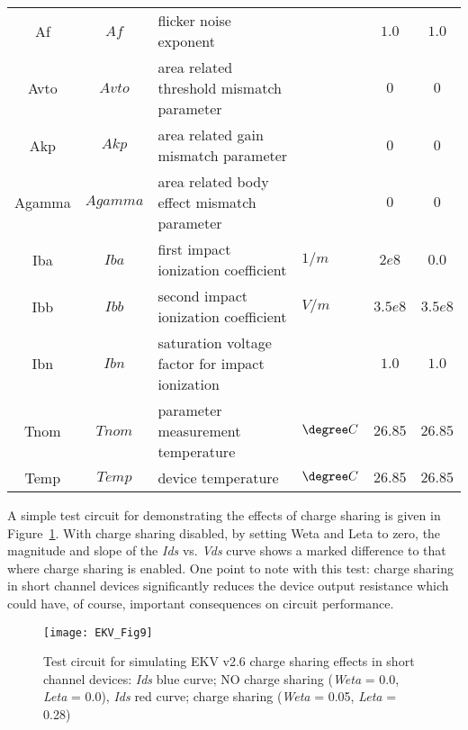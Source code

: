 \begin{scriptsize}
\begin{longtable}{ccllcc}
Af   & $Af$  & flicker noise exponent                   &    & $1.0$ & $1.0$ \\
Avto  & $Avto$ & area related threshold mismatch parameter  &    & $0$ & $0$ \\
Akp   & $Akp$  & area related gain mismatch parameter       &    & $0$ & $0$ \\
Agamma   & $Agamma$  & area related body effect mismatch parameter &    & $0$ & $0$ \\
Iba  & $Iba$ & first impact ionization coefficient  & $1/m$   & $2e8$ & $0.0$ \\
Ibb   & $Ibb$  & second impact ionization coefficient & $V/m$    & $3.5e8$ & $3.5e8$ \\
Ibn   & $Ibn$  & saturation voltage factor for impact ionization  &    & $1.0$ & $1.0$ \\
Tnom & $Tnom$ & parameter measurement temperature  & $\degree C$    & $26.85$ & $26.85$ \\
Temp & $Temp$ & device temperature  & $\degree C$   & $26.85$ & $26.85$ \\

\end{longtable}
\end{scriptsize}


A simple test circuit for demonstrating the effects of charge sharing
is given in Figure~\ref{fig:EKV9}. With charge sharing disabled, by
setting Weta and Leta to zero, the magnitude and slope of the
\textit{Ids} vs. \textit{Vds} curve shows a marked difference to that
where charge sharing is enabled.  One point to note with this test:
charge sharing in short channel devices significantly reduces the
device output resistance which could have, of course, important
consequences on circuit performance.

\begin{figure}
  \centering
  \texttt{[image: EKV\_Fig9]}
  \caption{Test circuit for simulating EKV v2.6 charge sharing effects in short channel devices: \textit{Ids} blue curve; NO charge sharing (\textit{Weta} = 0.0, \textit{Leta} = 0.0), \textit{Ids} red curve; charge sharing (\textit{Weta} = 0.05, \textit{Leta} = 0.28)}
  \label{fig:EKV9}
\end{figure}  



